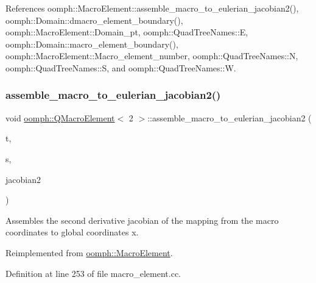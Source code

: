 References oomph\+::\+Macro\+Element\+::assemble\+\_\+macro\+\_\+to\+\_\+eulerian\+\_\+jacobian2(), oomph\+::\+Domain\+::dmacro\+\_\+element\+\_\+boundary(), oomph\+::\+Macro\+Element\+::\+Domain\+\_\+pt, oomph\+::\+Quad\+Tree\+Names\+::E, oomph\+::\+Domain\+::macro\+\_\+element\+\_\+boundary(), oomph\+::\+Macro\+Element\+::\+Macro\+\_\+element\+\_\+number, oomph\+::\+Quad\+Tree\+Names\+::N, oomph\+::\+Quad\+Tree\+Names\+::S, and oomph\+::\+Quad\+Tree\+Names\+::W.

\mbox{\label{classoomph_1_1QMacroElement_3_012_01_4_aef266683860031114776d25f51e8e306}} 
\subsubsection{\texorpdfstring{assemble\+\_\+macro\+\_\+to\+\_\+eulerian\+\_\+jacobian2()}{assemble\_macro\_to\_eulerian\_jacobian2()}}
{\footnotesize\ttfamily void \hyperlink{classoomph_1_1QMacroElement}{oomph\+::\+Q\+Macro\+Element}$<$ 2 $>$\+::assemble\+\_\+macro\+\_\+to\+\_\+eulerian\+\_\+jacobian2 (\begin{DoxyParamCaption}\item[{const unsigned \&}]{t,  }\item[{const \hyperlink{classoomph_1_1Vector}{Vector}$<$ double $>$ \&}]{s,  }\item[{\hyperlink{classoomph_1_1DenseMatrix}{Dense\+Matrix}$<$ double $>$ \&}]{jacobian2 }\end{DoxyParamCaption})\hspace{0.3cm}{\ttfamily [virtual]}}



Assembles the second derivative jacobian of the mapping from the macro coordinates to global coordinates x. 



Reimplemented from \hyperlink{classoomph_1_1MacroElement_a3c898b6deef9f8bfcc957313030a3e68}{oomph\+::\+Macro\+Element}.



Definition at line 253 of file macro\+\_\+element.\+cc.



